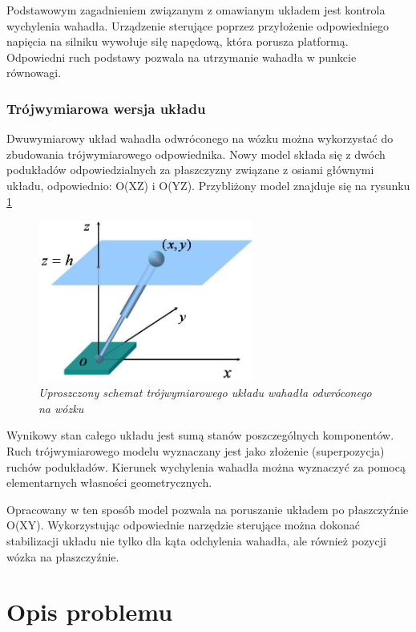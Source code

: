 \documentclass[12pt, oneside]{report}
\theoremstyle{definition}
\begin{document}
Podstawowym zagadnieniem związanym z omawianym układem jest kontrola wychylenia wahadła. Urządzenie sterujące poprzez przyłożenie odpowiedniego napięcia na silniku wywołuje siłę napędową, która porusza platformą. Odpowiedni ruch podstawy pozwala na utrzymanie wahadła w punkcie równowagi.

\subsubsection{Trójwymiarowa wersja układu}
Dwuwymiarowy układ wahadła odwróconego na wózku można wykorzystać do zbudowania trójwymiarowego odpowiednika. Nowy model składa się z dwóch podukładów odpowiedzialnych za płaszczyzny związane z osiami głównymi układu, odpowiednio: O(XZ) i O(YZ). Przybliżony model znajduje się na rysunku \ref{3DimModel}

\begin{figure}[H]
	\centering
		\includegraphics[width = 200pt]{3DimModel} 
		\caption{\textit{Uproszczony schemat trójwymiarowego układu wahadła odwróconego na wózku \cite{3DimModel}}}
		\label{3DimModel}
\end{figure}

Wynikowy stan całego układu jest sumą stanów poszczególnych komponentów. Ruch trójwymiarowego modelu wyznaczany jest jako złożenie (superpozycja) ruchów podukładów. Kierunek wychylenia wahadła można wyznaczyć za pomocą elementarnych własności geometrycznych. 

Opracowany w ten sposób model pozwala na poruszanie układem po płaszczyźnie O(XY). Wykorzystując odpowiednie narzędzie sterujące można dokonać stabilizacji układu nie tylko dla kąta odchylenia wahadła, ale również pozycji wózka na płaszczyźnie.

\section{Opis problemu}
\end{document}
